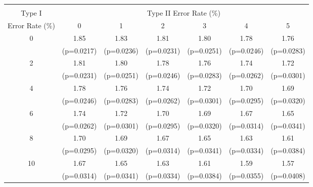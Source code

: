 \scriptsize{
\begin{tabular}{c|*{6}{c}}
\hline\hline \\[-8pt]
\rowcolor{yellow!15} Type I & \multicolumn{6}{c}{Type II Error Rate (\%)} \\
\rowcolor{yellow!15} Error Rate (\%)   & 0 & 1 & 2 & 3 & 4 & 5 \\ \hline
0 & 1.85 & 1.83 & 1.81 & 1.80 & 1.78 & 1.76 \\
 & (p=0.0217) & (p=0.0236) & (p=0.0231) & (p=0.0251) & (p=0.0246) & (p=0.0283) \\
[1em]
2 & 1.81 & 1.80 & 1.78 & 1.76 & 1.74 & 1.72 \\
 & (p=0.0231) & (p=0.0251) & (p=0.0246) & (p=0.0283) & (p=0.0262) & (p=0.0301) \\
[1em]
4 & 1.78 & 1.76 & 1.74 & 1.72 & 1.70 & 1.69 \\
 & (p=0.0246) & (p=0.0283) & (p=0.0262) & (p=0.0301) & (p=0.0295) & (p=0.0320) \\
[1em]
6 & 1.74 & 1.72 & 1.70 & 1.69 & 1.67 & 1.65 \\
 & (p=0.0262) & (p=0.0301) & (p=0.0295) & (p=0.0320) & (p=0.0314) & (p=0.0341) \\
[1em]
8 & 1.70 & 1.69 & 1.67 & 1.65 & 1.63 & 1.61 \\
 & (p=0.0295) & (p=0.0320) & (p=0.0314) & (p=0.0341) & (p=0.0334) & (p=0.0384) \\
[1em]
10 & 1.67 & 1.65 & 1.63 & 1.61 & 1.59 & 1.57 \\
 & (p=0.0314) & (p=0.0341) & (p=0.0334) & (p=0.0384) & (p=0.0355) & (p=0.0408) \\
\hline \hline
\end{tabular}
}